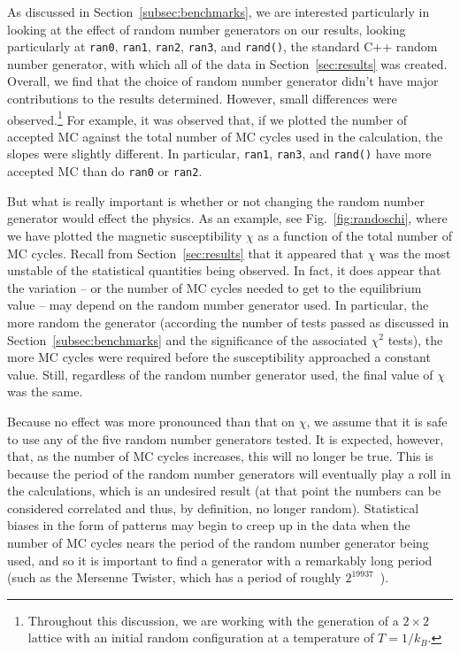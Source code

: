 \documentclass[12pt]{article}
\numberwithin{equation}{section}
\begin{document}
As discussed in Section~\ref{subsec:benchmarks}, we are interested particularly in looking at the effect of random number generators on our results, looking particularly at \texttt{ran0}, \texttt{ran1}, \texttt{ran2}, \texttt{ran3}, and \texttt{rand()}, the standard C++ random number generator, with which all of the data in Section~\ref{sec:results} was created.  Overall, we find that the choice of random number generator didn't have major contributions to the results determined.  However, small differences were observed.\footnote{Throughout this discussion, we are working with the generation of a $2\times2$ lattice with an initial random configuration at a temperature of $T=1/k_{B}$.}  For example, it was observed that, if we plotted the number of accepted MC against the total number of MC cycles used in the calculation, the slopes were slightly different.   In particular, \texttt{ran1}, \texttt{ran3}, and \texttt{rand()} have more accepted MC than do \texttt{ran0} or \texttt{ran2}.  
\par But what is really important is whether or not changing the random number generator would effect the physics.  As an example, see Fig.~\ref{fig:randoschi}, where we have plotted the magnetic susceptibility $\chi$ as a function of the total number of MC cycles.  Recall from Section~\ref{sec:results} that it appeared that $\chi$ was the most unstable of the statistical quantities being observed.  In fact, it does appear that the variation -- or the number of MC cycles needed to get to the equilibrium value -- may depend on the random number generator used.  In particular, the more random the generator (according the number of tests passed as discussed in Section~\ref{subsec:benchmarks} and the significance of the associated $\chi^{2}$ tests), the more MC cycles were required before the susceptibility approached a constant value.  Still, regardless of the random number generator used, the final value of $\chi$ was the same.  
\par Because no effect was more pronounced than that on $\chi$, we assume that it is safe to use any of the five random number generators tested.  It is expected, however, that, as the number of MC cycles increases, this will no longer be true.  This is because the period of the random number generators will eventually play a roll in the calculations, which is an undesired result (at that point the numbers can be considered correlated and thus, by definition, no longer random).  Statistical biases in the form of patterns may begin to creep up in the data when the number of MC cycles nears the period of the random number generator being used, and so it is important to find a generator with a remarkably long period (such as the Mersenne Twister, which has a period of roughly $2^{19937}$~\cite{lecture}).
\end{document}
